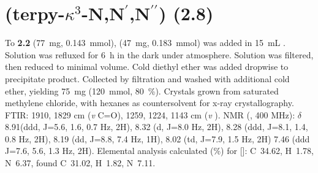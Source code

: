\section{(terpy-$\kappa^3$-N,N$^\prime$,N$^{\prime \prime}$) (\textbf{2.8})}\label{sec.c8}
To \textbf{2.2} (77~mg,  0.143~mmol),  (47~mg,  0.183~mmol) was added in 15~mL . Solution was refluxed for 6~h in the dark under  atmosphere. Solution was filtered, then reduced to minimal volume. Cold diethyl ether was added dropwise to precipitate product. Collected by filtration and washed with additional cold ether, yielding 75~mg (120~mmol, 80~\%).  Crystals grown from saturated methylene chloride, with hexanes as countersolvent for x-ray crystallography. FTIR: 1910, 1829 cm (\textit{v} C=O), 1259, 1224, 1143 cm (\textit{v} ).  NMR (, 400 MHz): $\delta$ 8.91(ddd, J=5.6, 1.6, 0.7 Hz, 2H), 8.32 (d, J=8.0 Hz, 2H), 8.28 (ddd, J=8.1, 1.4, 0.8 Hz, 2H), 8.19 (dd, J=8.8, 7.4 Hz, 1H), 8.02 (td, J=7.9, 1.5 Hz, 2H) 7.46 (ddd J=7.6, 5.6, 1.3 Hz, 2H).  Elemental analysis calculated (\%) for []: C~34.62, H~1.78, N~6.37, found C~31.02, H~1.82, N~7.11.


